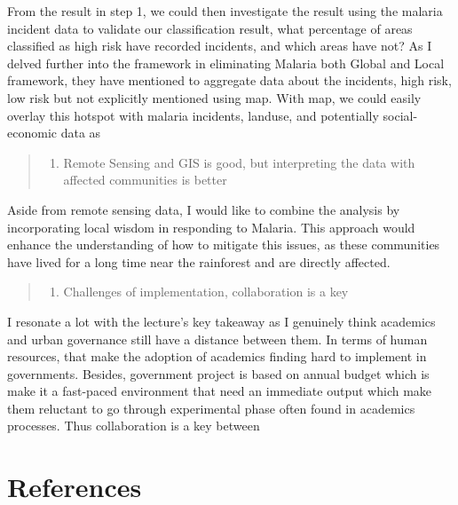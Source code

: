 \documentclass[
  letterpaper,
  DIV=11,
  numbers=noendperiod]{scrreprt}
\providecommand{\tightlist}{%
  \setlength{\itemsep}{0pt}\setlength{\parskip}{0pt}}\usepackage{longtable,booktabs,array}
\begin{document}
From the result in step 1, we could then investigate the result using
the malaria incident data to validate our classification result, what
percentage of areas classified as high risk have recorded incidents, and
which areas have not? As I delved further into the framework in
eliminating Malaria both Global and Local framework, they have mentioned
to aggregate data about the incidents, high risk, low risk but not
explicitly mentioned using map. With map, we could easily overlay this
hotspot with malaria incidents, landuse, and potentially social-economic
data as

\begin{quote}
\begin{enumerate}
\def\labelenumi{\arabic{enumi}.}
\setcounter{enumi}{1}
\tightlist
\item
  Remote Sensing and GIS is good, but interpreting the data with
  affected communities is better
\end{enumerate}
\end{quote}

Aside from remote sensing data, I would like to combine the analysis by
incorporating local wisdom in responding to Malaria. This approach would
enhance the understanding of how to mitigate this issues, as these
communities have lived for a long time near the rainforest and are
directly affected.

\begin{quote}
\begin{enumerate}
\def\labelenumi{\arabic{enumi}.}
\setcounter{enumi}{2}
\tightlist
\item
  Challenges of implementation, collaboration is a key
\end{enumerate}
\end{quote}

I resonate a lot with the lecture's key takeaway as I genuinely think
academics and urban governance still have a distance between them. In
terms of human resources, that make the adoption of academics finding
hard to implement in governments. Besides, government project is based
on annual budget which is make it a fast-paced environment that need an
immediate output which make them reluctant to go through experimental
phase often found in academics processes. Thus collaboration is a key
between

\hypertarget{references-1}{%
\section*{References}\label{references-1}}
\end{document}
